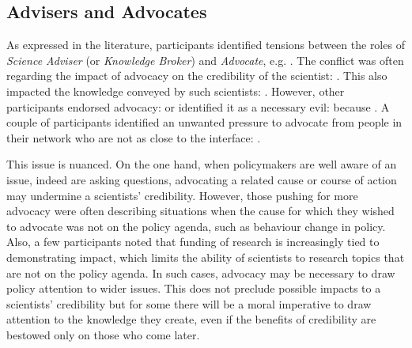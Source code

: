 \subsection{Advisers and Advocates}\label{sec:disadvocacy}

As expressed in the literature, participants identified tensions between the roles of \emph{Science Adviser} (or \emph{Knowledge Broker}) and \emph{Advocate}, e.g. . The conflict was often regarding the impact of advocacy on the credibility of the scientist: . This also impacted the knowledge conveyed by such scientists: . However, other participants endorsed advocacy:  or identified it as a necessary evil:  because . A couple of participants identified an unwanted pressure to advocate from people in their network who are not as close to the interface: .

This issue is nuanced. On the one hand, when policymakers are well aware of an issue, indeed are asking questions, advocating a related cause or course of action may undermine a scientists' credibility. However, those pushing for more advocacy were often describing situations when the cause for which they wished to advocate was not on the policy agenda, such as behaviour change in \CAN{} policy. Also, a few participants noted that funding of research is increasingly tied to demonstrating impact, which limits the ability of scientists to research topics that are not on the policy agenda. In such cases, advocacy may be necessary to draw policy attention to wider issues. This does not preclude possible impacts to a scientists' credibility but for some there will be a moral imperative to draw attention to the knowledge they create, even if the benefits of credibility are bestowed only on those who come later. 

